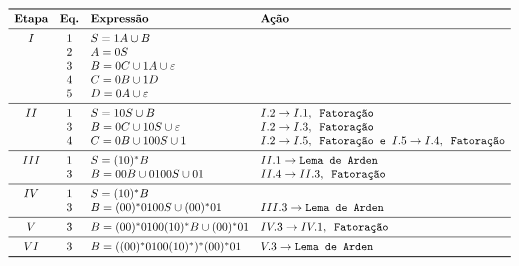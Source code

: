 \documentclass[12pt]{article}
\newcommand{\ve}{\ensuremath{\varepsilon}}
\begin{document}
\begin{tcolorbox}[breakable,rounded corners, colback=yellow!5, colframe=red!40!black, title={Extração de expressão regular $\mathcal{R}_2$ da gramática $G_2$, tal que $\mathcal{L}(\mathcal{R}_2)=\mathcal{L}(G_2)$}]
  $$
  \begin{array}{ccll}
  \toprule
  \textbf{Etapa} & \textbf{Eq.} & \textbf{Expressão} & \textbf{Ação}\\
  \midrule
    I & 1 & S = 1A \cup B                &\\
      & 2 & A = 0S                       &\\
      & 3 & B = 0C \cup 1A \cup \ve      &\\
      & 4 & C = 0B \cup 1D               &\\
      & 5 & D = 0A \cup \ve              &\\
  \midrule
   II & 1 & S = 10S \cup B               & I.2 \to I.1, \texttt{ Fatoração} \\
      & 3 & B = 0C \cup 10S \cup \ve     & I.2 \to I.3, \texttt{ Fatoração} \\
      & 4 & C = 0B \cup 100S \cup 1       & I.2 \to I.5, \texttt{ Fatoração e } I.5 \to I.4, \texttt{ Fatoração}\\
  \midrule
  III & 1 & S = (10)^*B                  & II.1 \to \texttt{Lema de Arden}\\
      & 3 & B = 00B \cup 0100S \cup 01   & II.4 \to II.3,\texttt{ 
 Fatoração}\\
  \midrule
   IV & 1 & S = (10)^*B                  & \\
      & 3 & B = (00)^*0100S \cup (00)^*01& III.3 \to \texttt{Lema de Arden}\\
  \midrule
    V & 3 & B = (00)^*0100(10)^*B \cup (00)^*01 & IV.3 \to IV.1,\texttt{ Fatoração}\\
  \midrule
   VI & 3 & B = ((00)^*0100(10)^*)^*(00)^*01 & V.3 \to \texttt{Lema de Arden}\\
  \bottomrule
  \end{array}
  $$
\end{tcolorbox}
\end{document}
